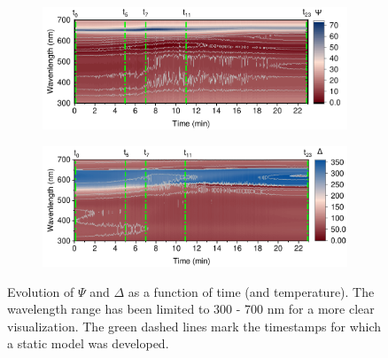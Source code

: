 \begin{figure}[ht!]
    \centering
    \begin{subfigure}[t]{0.9\textwidth} %
        \centering
        \includegraphics[width=\textwidth]{chapters/ellipsometry/image/Psi_Contour - MRS.pdf} %
    \end{subfigure}

    \vspace{1em} %

    \begin{subfigure}[t]{0.9\textwidth} %
        \centering
        \includegraphics[width=\textwidth]{chapters/ellipsometry/image/Delta_Contour - MRS.pdf} %
    \end{subfigure}

    \caption{Evolution of $\Psi$ and $\Delta$ as a function of time (and temperature). The wavelength range has been limited to 300 - 700 nm for a more clear visualization. The green dashed lines mark the timestamps for which a static model was developed. }
    \label{fig:ellipsometry:raw_psi_delta}
\end{figure}

